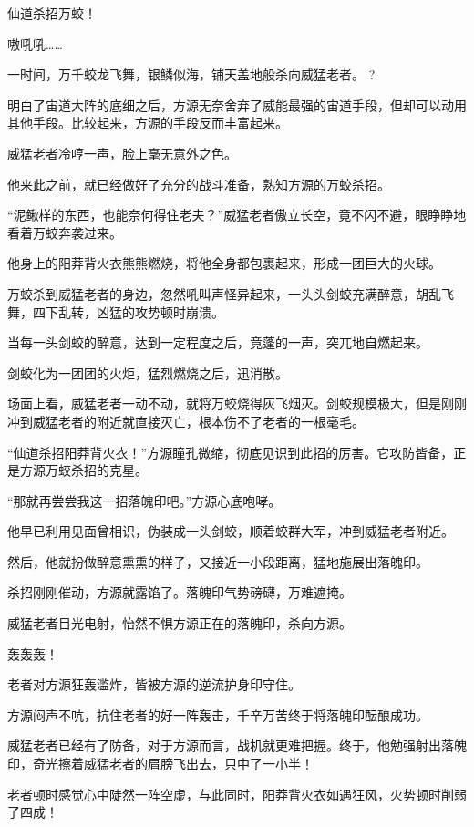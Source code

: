 
\begin{this_body}

仙道杀招万蛟！

嗷吼吼……

一时间，万千蛟龙飞舞，银鳞似海，铺天盖地般杀向威猛老者。 ?

明白了宙道大阵的底细之后，方源无奈舍弃了威能最强的宙道手段，但却可以动用其他手段。比较起来，方源的手段反而丰富起来。

威猛老者冷哼一声，脸上毫无意外之色。

他来此之前，就已经做好了充分的战斗准备，熟知方源的万蛟杀招。

“泥鳅样的东西，也能奈何得住老夫？”威猛老者傲立长空，竟不闪不避，眼睁睁地看着万蛟奔袭过来。

他身上的阳莽背火衣熊熊燃烧，将他全身都包裹起来，形成一团巨大的火球。

万蛟杀到威猛老者的身边，忽然吼叫声怪异起来，一头头剑蛟充满醉意，胡乱飞舞，四下乱转，凶猛的攻势顿时崩溃。

当每一头剑蛟的醉意，达到一定程度之后，竟蓬的一声，突兀地自燃起来。

剑蛟化为一团团的火炬，猛烈燃烧之后，迅消散。

场面上看，威猛老者一动不动，就将万蛟烧得灰飞烟灭。剑蛟规模极大，但是刚刚冲到威猛老者的附近就直接灭亡，根本伤不了老者的一根毫毛。

“仙道杀招阳莽背火衣！”方源瞳孔微缩，彻底见识到此招的厉害。它攻防皆备，正是方源万蛟杀招的克星。

“那就再尝尝我这一招落魄印吧。”方源心底咆哮。

他早已利用见面曾相识，伪装成一头剑蛟，顺着蛟群大军，冲到威猛老者附近。

然后，他就扮做醉意熏熏的样子，又接近一小段距离，猛地施展出落魄印。

杀招刚刚催动，方源就露馅了。落魄印气势磅礴，万难遮掩。

威猛老者目光电射，怡然不惧方源正在的落魄印，杀向方源。

轰轰轰！

老者对方源狂轰滥炸，皆被方源的逆流护身印守住。

方源闷声不吭，抗住老者的好一阵轰击，千辛万苦终于将落魄印酝酿成功。

威猛老者已经有了防备，对于方源而言，战机就更难把握。终于，他勉强射出落魄印，奇光擦着威猛老者的肩膀飞出去，只中了一小半！

老者顿时感觉心中陡然一阵空虚，与此同时，阳莽背火衣如遇狂风，火势顿时削弱了四成！


\end{this_body}
